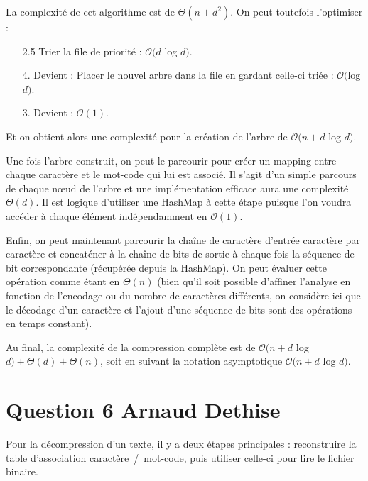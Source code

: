 \documentclass[10pt,a4paper]{article}
\begin{document}
	La complexité de cet algorithme est de $\Theta(n + d^2)$. On peut toutefois l'optimiser :
	\vspace{0.3cm}
	
	\begin{enumerate}
	\item[2.5] Trier la file de priorité : $\mathcal{O}(d $ log $d)$.
	\item[4.] Devient : Placer le nouvel arbre dans la file en gardant celle-ci triée : $\mathcal{O}($log $d)$.
	\item[3.] Devient : $\mathcal{O}(1)$.
	\end{enumerate}
	\vspace{0.3cm}
	
	Et on obtient alors une complexité pour la création de l'arbre de $\mathcal{O}(n + d $ log $ d)$.
	
	Une fois l'arbre construit, on peut le parcourir pour créer un mapping entre chaque caractère et le mot-code qui lui est associé. 
	Il s'agit d'un simple parcours de chaque nœud de l'arbre et une implémentation efficace aura une complexité $\Theta(d)$. 
	Il est logique d'utiliser une HashMap à cette étape puisque l'on voudra accéder à chaque élément indépendamment en $\mathcal{O}(1)$.
	
	Enfin, on peut maintenant parcourir la chaîne de caractère d'entrée caractère par caractère et concaténer à la chaîne de bits de sortie à chaque fois la séquence de bit correspondante (récupérée depuis la HashMap). 
	On peut évaluer cette opération comme étant en $\Theta(n)$ (bien qu'il soit possible  d'affiner l'analyse en fonction de l'encodage ou du nombre de caractères différents, on considère ici que le décodage d'un caractère et l'ajout d'une séquence de bits sont des opérations en temps constant).
	
	\vspace{0.3cm}
	Au final, la complexité de la compression complète est de $\mathcal{O}(n + d $ log $ d) + \Theta(d) + \Theta(n)$, soit en suivant la notation asymptotique $\mathcal{O}(n + d $ log $ d)$.
	

\section*{Question 6 Arnaud Dethise}

	Pour la décompression d'un texte, il y a deux étapes principales : reconstruire la table d'association caractère~/~mot-code, puis utiliser celle-ci pour lire le fichier binaire.
	
\end{document}
